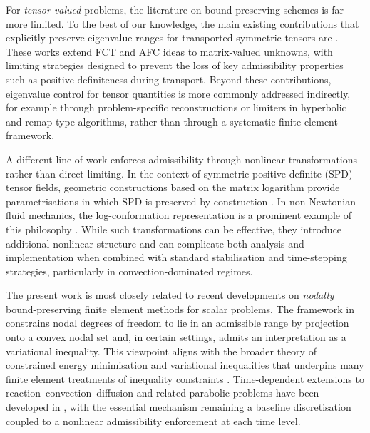 \documentclass[final,12pt]{amsart}
\theoremstyle{plain}
\theoremstyle{definition}
\begin{document}
For {\em tensor-valued} problems, the literature on bound-preserving
schemes is far more limited. To the best of our knowledge, the main
existing contributions that explicitly preserve eigenvalue ranges for
transported symmetric tensors are \cite{lohmann2017flux,lohmann2019algebraic}.
These works extend FCT and AFC ideas to matrix-valued unknowns, with
limiting strategies designed to prevent the loss of key admissibility
properties such as positive definiteness during transport. Beyond
these contributions, eigenvalue control for tensor quantities is more
commonly addressed indirectly, for example through problem-specific
reconstructions or limiters in hyperbolic and remap-type algorithms,
rather than through a systematic finite element framework.

A different line of work enforces admissibility through nonlinear
transformations rather than direct limiting. In the context of
symmetric positive-definite (SPD) tensor fields, geometric
constructions based on the matrix logarithm provide parametrisations
in which SPD is preserved by construction \cite{Arsigny2006,Moakher2005}.
In non-Newtonian fluid mechanics, the log-conformation representation
is a prominent example of this philosophy \cite{FK04}. While such
transformations can be effective, they introduce additional nonlinear
structure and can complicate both analysis and implementation when
combined with standard stabilisation and time-stepping strategies,
particularly in convection-dominated regimes.

The present work is most closely related to recent developments on
{\em nodally} bound-preserving finite element methods for scalar
problems. The framework in \cite{BGPV23} constrains nodal degrees of
freedom to lie in an admissible range by projection onto a convex
nodal set and, in certain settings, admits an interpretation as a
variational inequality. This viewpoint aligns with the broader theory
of constrained energy minimisation and variational inequalities that
underpins many finite element treatments of inequality constraints
\cite{Stampacchia,kirby2024high,keith2024proximal}. Time-dependent
extensions to reaction--convection--diffusion and related parabolic
problems have been developed in
\cite{amiri2024nodally,amiri2025nodally}, with the essential mechanism
remaining a baseline discretisation coupled to a nonlinear
admissibility enforcement at each time level.
\end{document}
